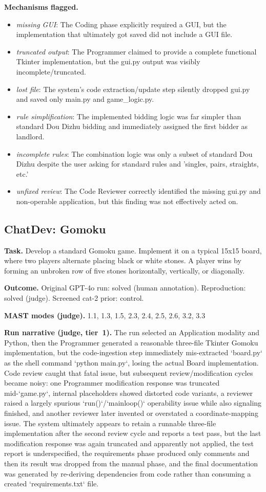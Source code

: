 \textbf{Mechanisms flagged.}
\begin{itemize}
  \item \emph{missing GUI}: The Coding phase explicitly required a GUI, but the implementation that ultimately got saved did not include a GUI file.
  \item \emph{truncated output}: The Programmer claimed to provide a complete functional Tkinter implementation, but the gui.py output was visibly incomplete/truncated.
  \item \emph{lost file}: The system's code extraction/update step silently dropped gui.py and saved only main.py and game\_logic.py.
  \item \emph{rule simplification}: The implemented bidding logic was far simpler than standard Dou Dizhu bidding and immediately assigned the first bidder as landlord.
  \item \emph{incomplete rules}: The combination logic was only a subset of standard Dou Dizhu despite the user asking for standard rules and 'singles, pairs, straights, etc.'
  \item \emph{unfixed review}: The Code Reviewer correctly identified the missing gui.py and non-operable application, but this finding was not effectively acted on.
\end{itemize}

\subsection*{ChatDev: Gomoku}
\textbf{Task.} Develop a standard Gomoku game. Implement it on a typical 15x15 board, where two players alternate placing black or white stones. A player wins by forming an unbroken row of five stones horizontally, vertically, or diagonally.

\textbf{Outcome.} Original GPT-4o run: solved (human annotation). Reproduction: solved (judge). Screened cat-2 prior: control.

\textbf{MAST modes (judge).} 1.1, 1.3, 1.5, 2.3, 2.4, 2.5, 2.6, 3.2, 3.3

\textbf{Run narrative (judge, tier~1).} The run selected an Application modality and Python, then the Programmer generated a reasonable three-file Tkinter Gomoku implementation, but the code-ingestion step immediately mis-extracted `board.py` as the shell command `python main.py`, losing the actual Board implementation. Code review caught that fatal issue, but subsequent review/modification cycles became noisy: one Programmer modification response was truncated mid-`game.py`, internal placeholders showed distorted code variants, a reviewer raised a largely spurious `run()`/`mainloop()` operability issue while also signaling finished, and another reviewer later invented or overstated a coordinate-mapping issue. The system ultimately appears to retain a runnable three-file implementation after the second review cycle and reports a test pass, but the last modification response was again truncated and apparently not applied, the test report is underspecified, the requirements phase produced only comments and then its result was dropped from the manual phase, and the final documentation was generated by re-deriving dependencies from code rather than consuming a created `requirements.txt` file.


